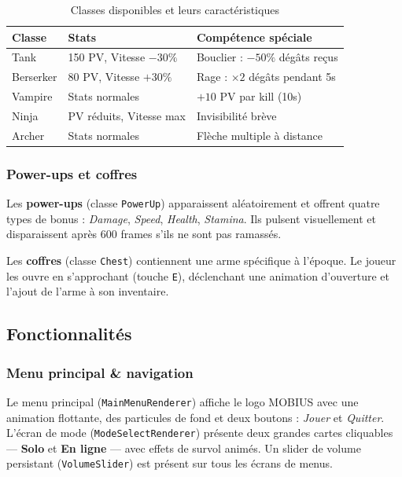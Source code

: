 \documentclass[12pt,a4paper]{article}
\begin{document}
\begin{table}[H]
\centering
\caption{Classes disponibles et leurs caractéristiques}
\renewcommand{\arraystretch}{1.35}
\begin{tabular}{@{}lll@{}}
\toprule
\rowcolor{tableheadbg}
\textbf{Classe} & \textbf{Stats} & \textbf{Compétence spéciale} \\
\midrule
Tank       & 150 PV, Vitesse $-30\%$ & Bouclier : $-50\%$ dégâts reçus \\
\rowcolor{rowaltbg}
Berserker  & 80 PV, Vitesse $+30\%$  & Rage : $\times 2$ dégâts pendant 5s \\
Vampire    & Stats normales           & $+10$ PV par kill (10s) \\
\rowcolor{rowaltbg}
Ninja      & PV réduits, Vitesse max  & Invisibilité brève \\
Archer     & Stats normales           & Flèche multiple à distance \\
\bottomrule
\end{tabular}
\end{table}

\subsubsection*{Power-ups et coffres}

Les \textbf{power-ups} (classe \texttt{PowerUp}) apparaissent aléatoirement et offrent quatre types de bonus : \textit{Damage}, \textit{Speed}, \textit{Health}, \textit{Stamina}. Ils pulsent visuellement et disparaissent après 600 frames s'ils ne sont pas ramassés.

Les \textbf{coffres} (classe \texttt{Chest}) contiennent une arme spécifique à l'époque. Le joueur les ouvre en s'approchant (touche \texttt{E}), déclenchant une animation d'ouverture et l'ajout de l'arme à son inventaire.

\subsection{Fonctionnalités}

\subsubsection*{Menu principal \& navigation}

Le menu principal (\texttt{MainMenuRenderer}) affiche le logo MOBIUS avec une animation flottante, des particules de fond et deux boutons : \textit{Jouer} et \textit{Quitter}. L'écran de mode (\texttt{ModeSelectRenderer}) présente deux grandes cartes cliquables --- \textbf{Solo} et \textbf{En ligne} --- avec effets de survol animés. Un slider de volume persistant (\texttt{VolumeSlider}) est présent sur tous les écrans de menus.
\end{document}
